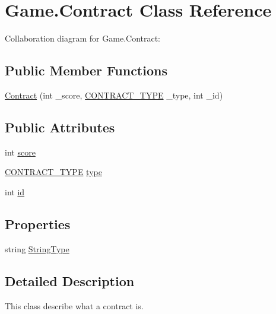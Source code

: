 \hypertarget{class_game_1_1_contract}{}\section{Game.\+Contract Class Reference}
\label{class_game_1_1_contract}


Collaboration diagram for Game.\+Contract\+:
\subsection*{Public Member Functions}
\begin{DoxyCompactItemize}
\item 
\hyperlink{class_game_1_1_contract_af6d4eea1e5b3806455598204dcb3e0dd}{Contract} (int \+\_\+score, \hyperlink{namespace_game_ae93b4df2175d9820e5d19dc1ab708e7e}{C\+O\+N\+T\+R\+A\+C\+T\+\_\+\+T\+Y\+PE} \+\_\+type, int \+\_\+id)
\end{DoxyCompactItemize}
\subsection*{Public Attributes}
\begin{DoxyCompactItemize}
\item 
int \hyperlink{class_game_1_1_contract_ac3f1ab61a37b44103e6a039142d47ce8}{score}
\item 
\hyperlink{namespace_game_ae93b4df2175d9820e5d19dc1ab708e7e}{C\+O\+N\+T\+R\+A\+C\+T\+\_\+\+T\+Y\+PE} \hyperlink{class_game_1_1_contract_a1aac9f683f470e81feda00aadb2fab03}{type}
\item 
int \hyperlink{class_game_1_1_contract_ab55a029c5f95f70064c1cc23af7ae037}{id}
\end{DoxyCompactItemize}
\subsection*{Properties}
\begin{DoxyCompactItemize}
\item 
string \hyperlink{class_game_1_1_contract_a10bb0c1876d9fe6c7a632e263171455c}{String\+Type}
\end{DoxyCompactItemize}


\subsection{Detailed Description}
This class describe what a contract is. 

